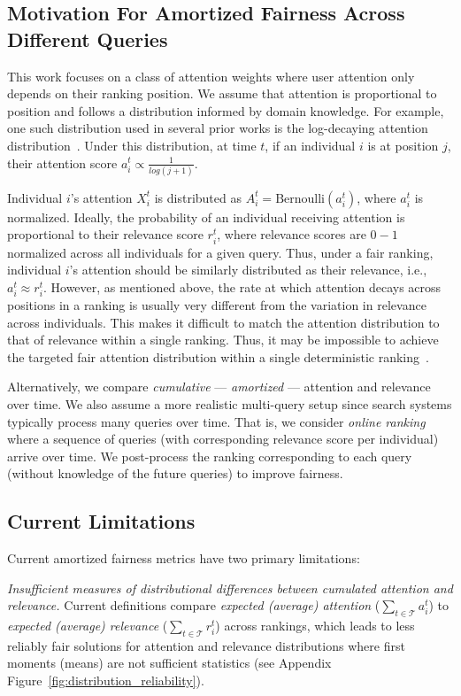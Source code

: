 \subsection{Motivation For Amortized Fairness Across Different Queries}

This work focuses on a class of attention weights where user attention only depends on their ranking position. We assume that attention is proportional to position and follows a distribution informed by domain knowledge. For example, one such distribution used in several prior works is the log-decaying attention distribution~\cite{singh2018fairness,castillo2019fairness}. Under this distribution, at time $t$, if an individual $i$ is at position $j$, their attention score $a^t_i \propto \frac{1}{log(j+1)}$. 

Individual $i$'s attention $X^t_i$ is distributed as $A^t_i=\text{Bernoulli}(a^t_i)$, where $a^t_i$ is normalized.  Ideally, the probability of an individual receiving attention is proportional to their relevance score $r^t_i$, where relevance scores are $0-1$ normalized across all individuals for a given query.  Thus, under a fair ranking, individual $i$'s attention should be similarly distributed as their relevance, i.e., $a^t_i \approx r^t_i$. However, as mentioned above, the rate at which attention decays across positions in a ranking is usually very different from the variation in relevance across individuals. This makes it difficult to match the attention distribution to that of relevance within a single ranking.  Thus, it may be impossible to achieve the targeted fair attention distribution within a single deterministic ranking~\cite{biega2018equity,diaz2020evaluating}.


Alternatively, we compare \emph{cumulative} --- \emph{amortized}  --- attention and relevance over time. We also assume a more realistic multi-query setup since search systems typically process many queries over time. That is, we consider \emph{online ranking} where a sequence of queries (with corresponding relevance score per individual) arrive over time. We post-process the ranking corresponding to each query (without knowledge of the future queries) to improve fairness.

\subsection{Current Limitations}
Current amortized fairness metrics have two primary limitations: 

\emph{Insufficient measures of distributional differences between cumulated attention and relevance.} Current definitions compare \emph{expected (average) attention} ($\sum_{t \in \mathcal{T}} a_i^t$) to \emph{expected (average) relevance} ($\sum_{t \in \mathcal{T}} r_i^t$) across rankings, which leads to less reliably fair solutions for attention and relevance distributions where first moments (means) are not sufficient statistics (see Appendix Figure~\ref{fig:distribution_reliability}). %

